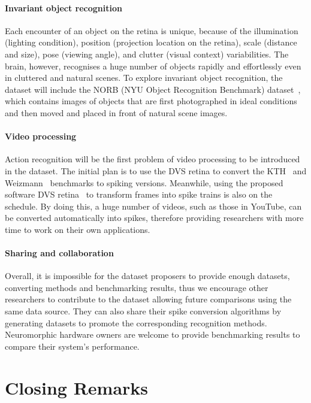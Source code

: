 \paragraph{Invariant object recognition}
Each encounter of an object on the retina is unique, because of the illumination (lighting condition), position (projection location on the retina), scale (distance and size), pose (viewing angle), and clutter (visual context) variabilities.
The brain, however, recognises a huge number of objects rapidly and effortlessly even in cluttered and natural scenes.
To explore invariant object recognition, the dataset will include the NORB (NYU Object Recognition Benchmark) dataset~\citep{lecun2004learning}, which contains images of objects that are first photographed in ideal conditions and then moved and placed in front of natural scene images.

\paragraph{Video processing}
Action recognition will be the first problem of video processing to be introduced in the dataset.
The initial plan is to use the DVS retina to convert the KTH~\citep{schuldt2004recognizing} and Weizmann~\citep{blank2005actions} benchmarks to spiking versions.
Meanwhile, using the proposed software DVS retina~\citep{7850249} to transform frames into spike trains is also on the schedule.
By doing this, a huge number of videos, such as those in YouTube, can be converted automatically into spikes, therefore providing researchers with more time to work on their own applications.

\paragraph{Sharing and collaboration}
Overall, it is impossible for the dataset proposers to provide enough datasets, converting methods and benchmarking results, thus we encourage other researchers to contribute to the dataset allowing future comparisons using the same data source.
They can also share their spike conversion algorithms by generating datasets to promote the corresponding recognition methods.
Neuromorphic hardware owners are welcome to provide benchmarking results to compare their system's performance.
\section{Closing Remarks}


